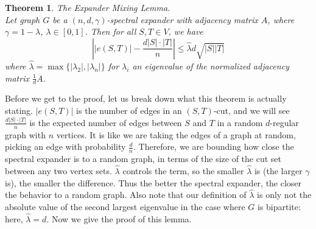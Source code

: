 \documentclass[11pt]{article}
\newtheorem{theorem}{Theorem}[section]
\theoremstyle{definition}
\theoremstyle{definition}
\theoremstyle{definition}
\begin{document}
\begin{theorem} The Expander Mixing Lemma. \\
Let graph $G$ be a $(n, d, \gamma)$-spectral expander with adjacency matrix $A$, 
where $\gamma = 1 - \lambda$, $\lambda \in [0, 1]$. Then for all
$S, T \in V$, we have 
\[
\left||e(S, T)| - \frac{d|S| \cdot |T|}{n}\right| \leq \hat{\lambda} d\sqrt{|S||T|}
\]
where $\hat{\lambda} = \max\{|\lambda_2|, |\lambda_n|\}$ for $\lambda_i$ an eigenvalue
of the normalized adjacency matrix $\frac{1}{d}A$.
\end{theorem}
Before we get to the proof, let us break down what this theorem is actually stating. 
$|e(S, T)|$ is the number of edges in an $(S, T)$-cut, and we will see $\frac{d|S| \cdot |T|}{n}$ is the expected number of edges between $S$ and $T$ in a random $d$-regular graph with $n$ vertices. It is like we are taking the edges of a graph at random, picking an edge with probability $\frac{d}{n}$. Therefore, we are bounding how close the spectral expander is to a random graph, in terms of the size of the cut set between any two vertex sets. $\hat{\lambda}$ controls the term, so the smaller $\hat{\lambda}$ is (the larger $\gamma$ is), the smaller the difference. Thus the better the spectral expander, the closer the behavior to a random graph.
Also note that our definition of $\hat{\lambda}$ is only not the absolute value of the second largest eigenvalue in the case where $G$ is bipartite: here, $\hat{\lambda} = d$. 
Now we give the proof of this lemma.
\end{document}
